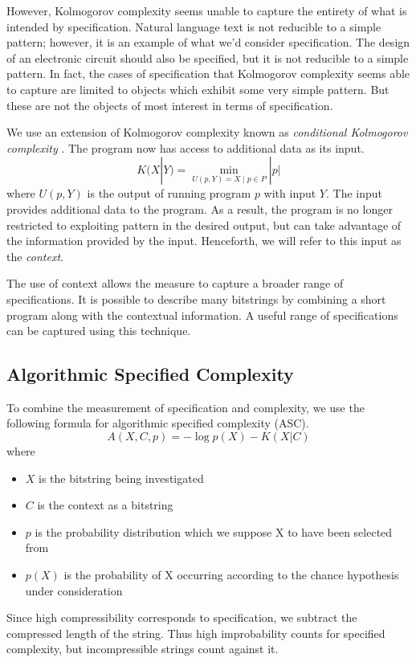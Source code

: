 However, Kolmogorov complexity seems unable to capture the entirety of what is intended by specification.
Natural language text is not reducible to a simple pattern; however, it is an example of what we'd consider specification.
The design of an electronic circuit should also be specified, but it is not reducible to a simple pattern.
In fact, the cases of specification that Kolmogorov complexity seems able to capture are limited to objects which exhibit some very simple pattern.
But these are not the objects of most interest in terms of specification.

We use an extension of Kolmogorov complexity known as {\it conditional Kolmogorov complexity} \cite{Kolmogorov1968}.
The program now has access to additional data as its input.
\begin{equation}
    K(X|Y) = \min_{U(p,Y) = X \mid p \in P} |p|
\end{equation} where $U(p,Y)$ is the output of running program $p$ with input $Y$.
The input provides additional data to the program.
As a result, the program is no longer restricted to exploiting pattern in the desired output, but can take advantage of the information provided by the input.
Henceforth, we will refer to this input as the {\it context}.

The use of context allows the measure to capture a broader range of specifications.
It is possible to describe many bitstrings by combining a short program along with the contextual information.
A useful range of specifications can be captured using this technique.

\subsection{Algorithmic Specified Complexity}

To combine the measurement of specification and complexity, we use the following formula for algorithmic specified complexity (ASC).
\begin{equation}
    \label{ASC}
    A(X,C,p) = -\log p(X) - K(X|C)
\end{equation} where
\begin{itemize}
    \item $X$ is the bitstring being investigated
    \item $C$ is the context as a bitstring
    \item $p$ is the probability distribution which we suppose X to have been selected from
    \item $p(X)$ is the probability of X occurring according to the chance hypothesis under consideration
\end{itemize}
Since high compressibility corresponds to specification, we subtract the compressed length of the string.
Thus high improbability counts for specified complexity, but incompressible strings count against it.

